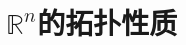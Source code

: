 \documentclass[../main.tex]{subfiles} %
\begin{document}
\chapter{$\mathbb{R}^n$的拓扑性质}







% 

% 

% 

% 

% 

% 

% 
\end{document}
